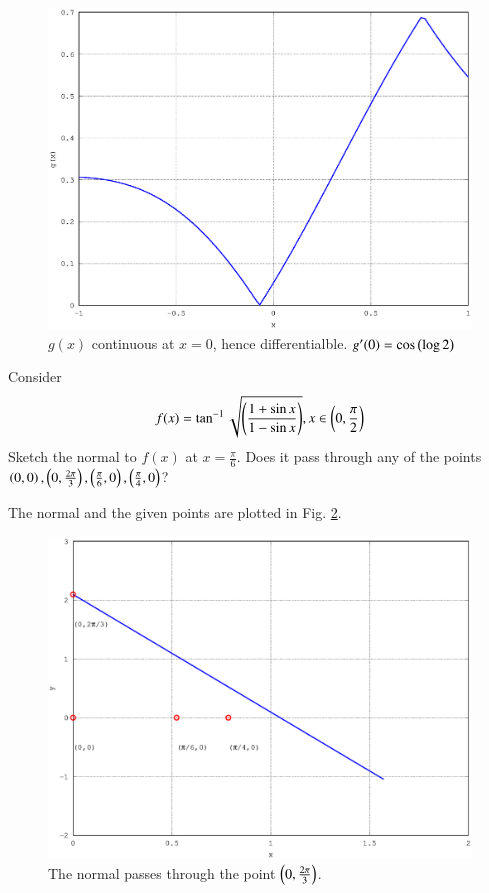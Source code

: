 \documentclass[journal,12pt,twocolumn]{IEEEtran}
\begin{document}
\solution


%
\begin{figure}[h]
\centering
\includegraphics[width=\columnwidth]{./figs/ee16b1030}
\caption{ $g(x)$ continuous at $x = 0$, hence differentialble.  $g^{\prime}(0) = \cos \left(\log 2\right)$}
\label{fig_30}	
\end{figure}
%
\begin{problem}
Consider 
\begin{equation*}
f(x) = \tan^{-1}\sqrt{\left(\frac{1+\sin x }{1-\sin x}\right)}, x \in \left(0,\frac{\pi}{2}\right)
\end{equation*}
Sketch the normal to $f(x)$ at $x = \frac{\pi}{6}$. Does it pass through any of the points $\left(0,0\right),\left(0,\frac{2\pi}{3}\right),\left(\frac{\pi}{6},0\right),\left(\frac{\pi}{4},0\right)$?
\end{problem}

The normal and the given points are plotted in Fig. \ref{fig_31}.

%
\begin{figure}[h]
\centering
\includegraphics[width=\columnwidth]{./figs/ee16b1031}
\caption{ The normal passes through the point $\left(0,\frac{2\pi}{3}\right)$.}
\label{fig_31}	
\end{figure}
\end{document}
